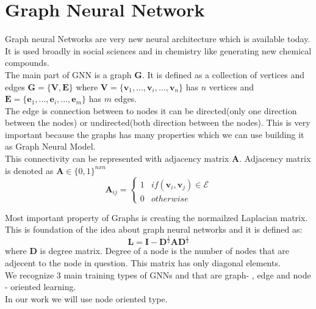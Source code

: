 \section{Graph Neural Network}
Graph neural Networks are very new neural architecture which is available today. It is used broadly in social sciences and in chemistry like generating new chemical compounds.\\
The main part of GNN is a graph $\mathbf{G}$. It is defined as a collection of vertices and edges $\mathbf{G}=\{\mathbf{V},\mathbf{E}\}$ where $\mathbf{V} = \{\mathbf{v}_1,...,\mathbf{v}_i,...,\mathbf{v}_n\}$ has $n$ vertices
and $\mathbf{E} = \{\mathbf{e}_1,...,\mathbf{e}_i,...,\mathbf{e}_m\}$
has $m$ edges.\\
The edge is connection between to nodes it can be directed(only one direction between the nodes) or undirected(both direction between the nodes). This is very important because the graphs has many properties which we can use building it as Graph Neural Model.\\
This connectivity can be represented with adjacency matrix $\mathbf{A}$.
Adjacency matrix is denoted as $\mathbf{A}\in \{0,1\}^{n x n}$ 
\begin{equation}
\mathbf{A}_{ij} =	\left\{\begin{matrix}
		1 & if (\mathbf{v}_i , \mathbf{v}_j)\in\mathcal{E}\\
		0 & otherwise
	\end{matrix}\right.
\end{equation}

Most important property of Graphs is creating the normailzed Laplacian matrix. This is foundation of the idea about graph neural networks and it is defined as:
\begin{equation}
	\mathbf{L}= \mathbf{I} - \mathbf{D}^{\frac{1}{2}}\mathbf{A}\mathbf{D}^{\frac{1}{2}} 
\end{equation} where $\mathbf{D}$ is degree matrix. Degree of a node is the number of nodes that are adjecent to the node in question. This matrix has only diagonal elements.\\
We recognize 3 main training types of GNNs and that are graph- , edge and node - oriented learning.\\
In our work we will use node oriented type. 

